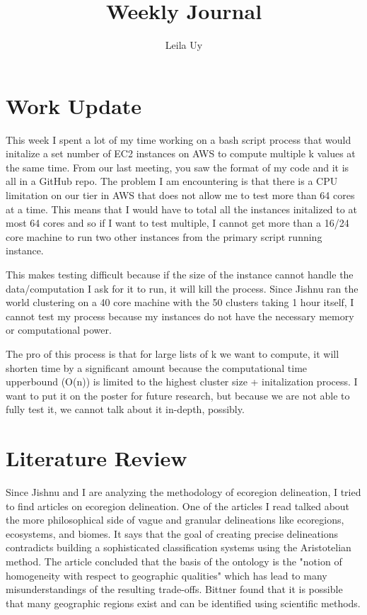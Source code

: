 \documentclass[a4paper,10pt]{article}
\title{Weekly Journal}
\author{Leila Uy}
\begin{document}
\maketitle

\section{Work Update}
This week I spent a lot of my time working on a bash script process that would initalize a set number of EC2 instances on AWS to compute multiple k values at the same time. From our last meeting, you saw the format of my code and it is all in a GitHub repo. The problem I am encountering is that there is a CPU limitation on our tier in AWS that does not allow me to test more than 64 cores at a time. This means that I would have to total all the instances initalized to at most 64 cores and so if I want to test multiple, I cannot get more than a 16/24 core machine to run two other instances from the primary script running instance. 

This makes testing difficult because if the size of the instance cannot handle the data/computation I ask for it to run, it will kill the process. Since Jishnu ran the world clustering on a 40 core machine with the 50 clusters taking 1 hour itself, I cannot test my process because my instances do not have the necessary memory or computational power.

The pro of this process is that for large lists of k we want to compute, it will shorten time by a significant amount because the computational time upperbound (O(n)) is limited to the highest cluster size + initalization process. I want to put it on the poster for future research, but because we are not able to fully test it, we cannot talk about it in-depth, possibly.


\section{Literature Review}
Since Jishnu and I are analyzing the methodology of ecoregion delineation, I tried to find articles on ecoregion delineation. One of the articles I read talked about the more philosophical side of vague and granular delineations like ecoregions, ecosystems, and biomes. It says that the goal of creating precise delineations contradicts building a sophisticated classification systems using the Aristotelian method. The article concluded that the basis of the ontology is the "notion of homogeneity with respect to geographic qualities" \cite{bittner2011vagueness} which has lead to many misunderstandings of the resulting trade-offs. Bittner found that it is possible that many geographic regions exist and can be identified using scientific methods.
\end{document}
